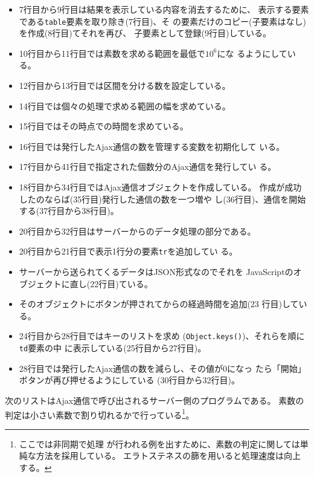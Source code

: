 \begin{Exec}
\begin{itemize}
\begin{itemize}
         \item 7行目から9行目は結果を表示している内容を消去するために、
               表示する要素である\texttt{table}要素を取り除き(7行目)、そ
               の要素だけのコピー(子要素はなし)を作成(8行目)てそれを再び、
               子要素として登録(9行目)している。
         \item 10行目から11行目では素数を求める範囲を最低で$10^{6}$にな
               るようにしている。
         \item 12行目から13行目では区間を分ける数を設定している。
         \item 14行目では個々の処理で求める範囲の幅を求めている。
         \item 15行目ではその時点での時間を求めている。
         \item 16行目では発行したAjax通信の数を管理する変数を初期化して
               いる。
         \item 17行目から41行目で指定された個数分のAjax通信を発行してい
               る。
         \item 18行目から34行目ではAjax通信オブジェクトを作成している。
               作成が成功したのならば(35行目)発行した通信の数を一つ増や
               し(36行目)、通信を開始する(37行目から38行目)。
         \item 20行目から32行目はサーバーからのデータ処理の部分である。
         \item 20行目から21行目で表示1行分の要素\texttt{tr}を追加してい
               る。
         \item サーバーから送られてくるデータはJSON形式なのでそれを
               JavaScriptのオブジェクトに直し(22行目)ている。
         \item そのオブジェクトにボタンが押されてからの経過時間を追加(23
               行目)している。
         \item 24行目から28行目ではキーのリストを求め
               (\texttt{Object.keys()})、それらを順に\texttt{td}要素の中
               に表示している(25行目から27行目)。
         \item 28行目では発行したAjax通信の数を減らし、その値が$0$になっ
               たら「開始」ボタンが再び押せるようにしている
               (30行目から32行目)。
        \end{itemize}
 \end{itemize}
 次のリストはAjax通信で呼び出されるサーバー側のプログラムである。
 素数の判定は小さい素数で割り切れるかで行っている\footnote{ここでは非同期で処理
 が行われる例を出すために、素数の判定に関しては単純な方法を採用している。
 エラトステネスの篩を用いると処理速度は向上する。}。

\end{Exec}
